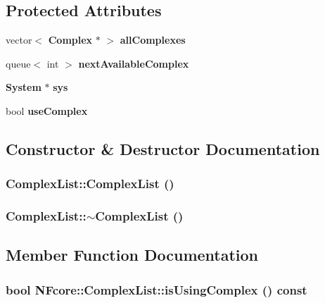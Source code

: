 \subsection*{Protected Attributes}
\begin{CompactItemize}
\item 
vector$<$ {\bf Complex} $\ast$ $>$ {\bf allComplexes}
\item 
queue$<$ int $>$ {\bf nextAvailableComplex}
\item 
{\bf System} $\ast$ {\bf sys}
\item 
bool {\bf useComplex}
\end{CompactItemize}


\subsection{Constructor \& Destructor Documentation}
\subsubsection{\setlength{\rightskip}{0pt plus 5cm}ComplexList::ComplexList ()}\label{classNFcore_1_1ComplexList_7af5cdce42bafe57dd681c19100ddd4b}


\subsubsection{\setlength{\rightskip}{0pt plus 5cm}ComplexList::$\sim$ComplexList ()}\label{classNFcore_1_1ComplexList_00a16c47f49699657bc727dab354e1d3}




\subsection{Member Function Documentation}
\subsubsection{\setlength{\rightskip}{0pt plus 5cm}bool NFcore::ComplexList::isUsingComplex () const\hspace{0.3cm}{\tt  [inline]}}\label{classNFcore_1_1ComplexList_305333d3f840793251d8e3c38be2c3a7}


